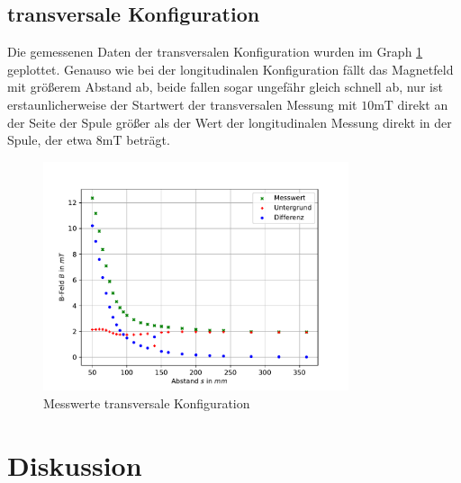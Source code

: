 \documentclass[11pt, a4paper]{article}
\begin{document}
    \subsection{transversale Konfiguration}
    Die gemessenen Daten der transversalen Konfiguration wurden im Graph \ref{fig:transmess} geplottet.
    Genauso wie bei der longitudinalen Konfiguration fällt das Magnetfeld mit größerem Abstand ab, beide fallen sogar ungefähr gleich schnell ab, nur ist erstaunlicherweise der Startwert der transversalen Messung mit $10 \si{\milli\tesla}$ direkt an der Seite der Spule größer als der Wert der longitudinalen Messung direkt in der Spule, der etwa $8 \si{\milli\tesla}$ beträgt.
    \begin{figure}[h]
        \centering
        \includegraphics[width=0.8\textwidth]{raw2.pdf}
        \caption{Messwerte transversale Konfiguration}
        \label{fig:transmess}
    \end{figure}





    \section{Diskussion}

    
    
\end{document}

